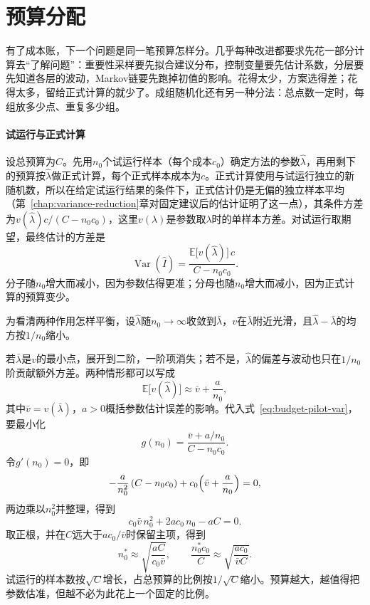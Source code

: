 \section{预算分配}
\label{sec:budget-allocation}

有了成本账，下一个问题是同一笔预算怎样分。几乎每种改进都要求先花一部分计算去“了解问题”：重要性采样要先拟合建议分布，控制变量要先估计系数，分层要先知道各层的波动，Markov链要先跑掉初值的影响。花得太少，方案选得差；花得太多，留给正式计算的就少了。成组随机化还有另一种分法：总点数一定时，每组放多少点、重复多少组。

\paragraph{试运行与正式计算}
设总预算为$C$。先用$n_{0}$个试运行样本（每个成本$c_{0}$）确定方法的参数$\hat{\lambda}$，再用剩下的预算按$\hat{\lambda}$做正式计算，每个正式样本成本为$c$。正式计算使用与试运行独立的新随机数，所以在给定试运行结果的条件下，正式估计仍是无偏的独立样本平均（第~\ref{chap:variance-reduction}章对固定建议后的估计证明了这一点），其条件方差为$v(\hat{\lambda})c/(C-n_{0}c_{0})$，这里$v(\lambda)$是参数取$\lambda$时的单样本方差。对试运行取期望，最终估计的方差是
\begin{equation}
  \operatorname{Var}(\hat{I})=\frac{\mathbb{E}\bigl[v(\hat{\lambda})\bigr]\,c}{C-n_{0}c_{0}} .
  \label{eq:budget-pilot-var}
\end{equation}
分子随$n_{0}$增大而减小，因为参数估得更准；分母也随$n_{0}$增大而减小，因为正式计算的预算变少。

为看清两种作用怎样平衡，设$\hat{\lambda}$随$n_{0}\to\infty$收敛到$\bar{\lambda}$，$v$在$\bar{\lambda}$附近光滑，且$\hat{\lambda}-\bar{\lambda}$的均方按$1/n_{0}$缩小。

若$\bar{\lambda}$是$v$的最小点，展开到二阶，一阶项消失；若不是，$\hat{\lambda}$的偏差与波动也只在$1/n_{0}$阶贡献额外方差。两种情形都可以写成
\[
  \mathbb{E}\bigl[v(\hat{\lambda})\bigr]\approx\bar{v}+\frac{a}{n_{0}},
\]
其中$\bar{v}=v(\bar{\lambda})$，$a>0$概括参数估计误差的影响。代入式~\eqref{eq:budget-pilot-var}，要最小化
\[
  g(n_{0})=\frac{\bar{v}+a/n_{0}}{C-n_{0}c_{0}} .
\]
令$g'(n_{0})=0$，即
\[
  -\frac{a}{n_{0}^{2}}\,(C-n_{0}c_{0})+c_{0}\Bigl(\bar{v}+\frac{a}{n_{0}}\Bigr)=0,
\]
两边乘以$n_{0}^{2}$并整理，得到
\[
  c_{0}\bar{v}\,n_{0}^{2}+2ac_{0}\,n_{0}-aC=0 .
\]
取正根，并在$C$远大于$ac_{0}/\bar{v}$时保留主项，得到
\begin{equation}
  n_{0}^{\ast}\approx\sqrt{\frac{aC}{c_{0}\bar{v}}},\qquad\frac{n_{0}^{\ast}c_{0}}{C}\approx\sqrt{\frac{ac_{0}}{\bar{v}C}} .
  \label{eq:budget-pilot-opt}
\end{equation}
试运行的样本数按$\sqrt{C}$增长，占总预算的比例按$1/\sqrt{C}$缩小。预算越大，越值得把参数估准，但越不必为此花上一个固定的比例。

